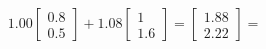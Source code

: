 \documentclass[preview]{standalone}
\begin{document}
\begin{align*}
1.00 \begin{bmatrix} 0.8 \\ 0.5 \end{bmatrix} + 1.08 \begin{bmatrix} 1 \\ 1.6 \end{bmatrix} = \begin{bmatrix} 1.88 \\ 2.22 \end{bmatrix} =
\end{align*}
\end{document}
